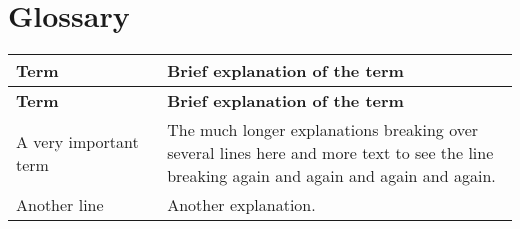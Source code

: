 \documentclass[report]{subfiles}
\begin{document}
\section{Glossary}

\renewcommand{\arraystretch}{1.5}

\begin{longtable}{p{0.3\linewidth} p{0.8\linewidth}}
\hline \textbf{Term} & \textbf{Brief explanation of the term}\\ \hline\hline
\endfirsthead

\hline \textbf{Term} & \textbf{Brief explanation of the term}\\ \hline\hline
\endhead

A very important term & The much longer explanations breaking over several lines here and more text to see the line breaking again and again and again and again.\\
Another line & Another explanation.\\
\end{longtable}
\end{document}
